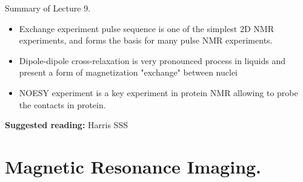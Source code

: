 \documentclass[handout]{beamer}
\begin{document}

\begin{frame}{Summary of Lecture 9.}
  \begin{itemize}
  	\item Exchange experiment pulse sequence is one of the simplest 2D NMR experiments,  and forms the basis for many pulse NMR experiments.
  	\item Dipole-dipole cross-relaxation is very pronounced process in liquids and present a form of magnetization "exchange" between nuclei
  	\item NOESY experiment is a key experiment in protein NMR allowing to probe the contacts in protein.
  \end{itemize}
   \textbf{Suggested reading:} Harris SSS
\end{frame}


\section{Magnetic Resonance Imaging.}
\end{document}
